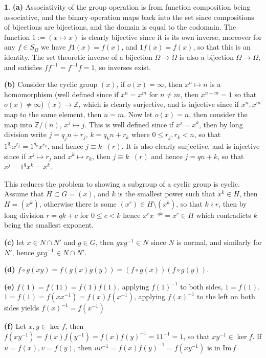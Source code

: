 \documentclass[10.5pt]{article}
\theoremstyle{definition}
\newtheorem{pb}{}
\newcommand{\tand}{\text{ and }}
\begin{document}
    \begin{pb}
        \textbf{(a)} Associativity of the group operation is from function composition being associative, and the binary operation maps back into the set since compositions of bijections are bijections, and the domain is equal to the codomain. The function \(1 := (x \mapsto x)\) is clearly bijective since it is its own inverse, moreover for any \(f \in S_\Omega\) we have \(f1(x) = f(x)\), and \(1f(x) = f(x)\), so that this is an identity. The set theoretic inverse of a bijection \(\Omega \to \Omega\) is also a bijection \(\Omega \to \Omega\), and satisfies \(ff^{-1} = f^{-1}f = 1\), so inverses exist.

        \textbf{(b)} Consider the cyclic group \((x)\), if \(o(x) = \infty\), then \(x^n \mapsto n\) is a homomorphism (well defined since if \(x^n = x^m\) for \(n \neq m\), then \(x^{n-m} = 1\) so that \(o(x) \neq \infty\)) \((x) \to \mathbb{Z}\), which is clearly surjective, and is injective since if \(x^n, x^m\) map to the same element, then \(n = m\). Now let \(o(x) = n\), then consider the map into \(\mathbb{Z}/(n)\), \(x^j \mapsto j\). This is well defined since if \(x^j = x^k\), then by long division write \(j = q_jn + r_j\), \(k = q_kn + r_k\) where \(0 \leq r_j, r_k < n\), so that \(1^{q_j} x^{r_j} = 1^{q_k}x^{r_k}\), and hence \(j \equiv k \;\;(r)\). It is also clearly surjective, and is injective since if \(x^j \mapsto r_j \tand x^k \mapsto r_k\), then \(j \equiv k \;\; (r)\) and hence \(j = qn + k\), so that \(x^j = 1^q x^k = x^k\).

        This reduces the problem to showing a subgroup of a cyclic group is cyclic. Assume that \(H \subset G = (x)\), and \(k\) is the smallest power such that \(x^k \in H\), then \(H = (x^k)\), otherwise there is some \((x^r) \in H \setminus (x^k)\), so that \(k \nmid r\), then by long division \(r = qk + c\) for \(0 \leq c < k\) hence \(x^rx^{-qk} = x^c \in H\) which contradicts \(k\) being the smallest exponent.

        \textbf{(c)} let \(x \in N \cap N'\) and \(g \in G\), then \(gxg^{-1} \in N\) since \(N\) is normal, and similarly for \(N'\), hence \(gxg^{-1} \in N\cap N'\).

        \textbf{(d)} \(f \circ g(xy) = f(g(x)g(y)) = (f\circ g(x))(f\circ g(y))\).
        
        \textbf{(e)} \(f(1) = f(11) = f(1)f(1)\), applying \(f(1)^{-1}\) to both sides, \(1 = f(1)\). \(1 = f(1) = f(xx^{-1}) = f(x)f(x^{-1})\), applying \(f(x)^{-1}\) to the left on both sides yields \(f(x)^{-1} = f(x^{-1})\)

        \textbf{(f)} Let \(x,y \in \ker f\), then \(f(xy^{-1}) = f(x)f(y^{-1}) = f(x)f(y)^{-1} = 1 1^{-1} = 1\), so that \(xy^{-1} \in \ker f\). If \(u = f(x), v = f(y)\), then \(uv^{-1} = f(x)f(y)^{-1} = f(xy^{-1})\) is in \(\text{Im}\,f\).
    \end{pb}
\end{document}
